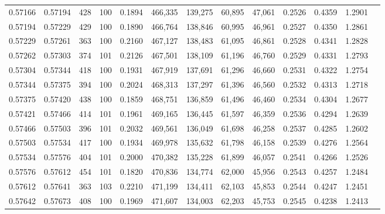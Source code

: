 \begin{tabular}{rrrrrrrrrrrrr}
0.57166 & 0.57194 &   428 & 100 &                                     0.1894 & 466,335 & 139,275 &  60,895 &  47,061 & 0.2526 & 0.4359 & 1.2901 \\
0.57194 & 0.57229 &   429 & 100 &                                     0.1890 & 466,764 & 138,846 &  60,995 &  46,961 & 0.2527 & 0.4350 & 1.2861 \\
0.57229 & 0.57261 &   363 & 100 &                                     0.2160 & 467,127 & 138,483 &  61,095 &  46,861 & 0.2528 & 0.4341 & 1.2828 \\
0.57262 & 0.57303 &   374 & 101 &                                     0.2126 & 467,501 & 138,109 &  61,196 &  46,760 & 0.2529 & 0.4331 & 1.2793 \\
0.57304 & 0.57344 &   418 & 100 &                                     0.1931 & 467,919 & 137,691 &  61,296 &  46,660 & 0.2531 & 0.4322 & 1.2754 \\
0.57344 & 0.57375 &   394 & 100 &                                     0.2024 & 468,313 & 137,297 &  61,396 &  46,560 & 0.2532 & 0.4313 & 1.2718 \\
0.57375 & 0.57420 &   438 & 100 &                                     0.1859 & 468,751 & 136,859 &  61,496 &  46,460 & 0.2534 & 0.4304 & 1.2677 \\
0.57421 & 0.57466 &   414 & 101 &                                     0.1961 & 469,165 & 136,445 &  61,597 &  46,359 & 0.2536 & 0.4294 & 1.2639 \\
0.57466 & 0.57503 &   396 & 101 &                                     0.2032 & 469,561 & 136,049 &  61,698 &  46,258 & 0.2537 & 0.4285 & 1.2602 \\
0.57503 & 0.57534 &   417 & 100 &                                     0.1934 & 469,978 & 135,632 &  61,798 &  46,158 & 0.2539 & 0.4276 & 1.2564 \\
0.57534 & 0.57576 &   404 & 101 &                                     0.2000 & 470,382 & 135,228 &  61,899 &  46,057 & 0.2541 & 0.4266 & 1.2526 \\
0.57576 & 0.57612 &   454 & 101 &                                     0.1820 & 470,836 & 134,774 &  62,000 &  45,956 & 0.2543 & 0.4257 & 1.2484 \\
0.57612 & 0.57641 &   363 & 103 &                                     0.2210 & 471,199 & 134,411 &  62,103 &  45,853 & 0.2544 & 0.4247 & 1.2451 \\
0.57642 & 0.57673 &   408 & 100 &                                     0.1969 & 471,607 & 134,003 &  62,203 &  45,753 & 0.2545 & 0.4238 & 1.2413 \\

\end{tabular}

